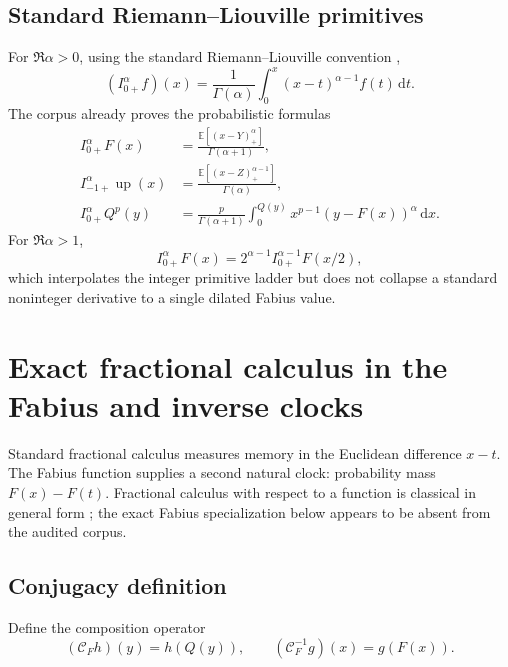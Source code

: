\documentclass[11pt,oneside]{article}
\theoremstyle{definition}
\theoremstyle{remark}
\newcommand{\Up}{\operatorname{up}}
\newcommand{\E}{\mathbb E}
\newcommand{\dd}{\,\mathrm d}
\newcommand{\1}{\mathbf 1}
\begin{document}
\subsection{Standard Riemann--Liouville primitives}

For $\Re\alpha>0$, using the standard Riemann--Liouville convention
\cite{p9:Samko,p9:Podlubny},
\begin{equation}
 (I_{0+}^\alpha f)(x)
 =\frac1{\Gamma(\alpha)}\int_0^x(x-t)^{\alpha-1}f(t)\dd t.
 \label{p9:eq:RL-def}
\end{equation}
The corpus already proves the probabilistic formulas
\begin{align}
 I_{0+}^\alpha F(x)
 &=\frac{\E[(x-Y)_+^\alpha]}{\Gamma(\alpha+1)},
 \label{p9:eq:RL-F-prob}\\
 I_{-1+}^\alpha\Up(x)
 &=\frac{\E[(x-Z)_+^{\alpha-1}]}{\Gamma(\alpha)},
 \label{p9:eq:RL-up-prob}\\
 I_{0+}^\alpha Q^p(y)
 &=\frac{p}{\Gamma(\alpha+1)}
   \int_0^{Q(y)}x^{p-1}(y-F(x))^\alpha\dd x.
 \label{p9:eq:RL-Qp-baseline}
\end{align}
For $\Re\alpha>1$,
\begin{equation}
 I_{0+}^\alpha F(x)
 =2^{\alpha-1}I_{0+}^{\alpha-1}F(x/2),
 \label{p9:eq:RL-dyadic-recurrence}
\end{equation}
which interpolates the integer primitive ladder but does not collapse a
standard noninteger derivative to a single dilated Fabius value.

\section{Exact fractional calculus in the Fabius and inverse clocks}
\label{p9:sec:F-clock}

Standard fractional calculus measures memory in the Euclidean difference
$x-t$.  The Fabius function supplies a second natural clock: probability mass
$F(x)-F(t)$.  Fractional calculus with respect to a function is classical in
general form \cite{p9:Oumarou2021}; the exact Fabius specialization below appears
to be absent from the audited corpus.

\subsection{Conjugacy definition}

Define the composition operator
\begin{equation}
 (\mathcal C_Fh)(y)=h(Q(y)),
 \qquad
 (\mathcal C_F^{-1}g)(x)=g(F(x)).
 \label{p9:eq:CF}
\end{equation}
\end{document}
